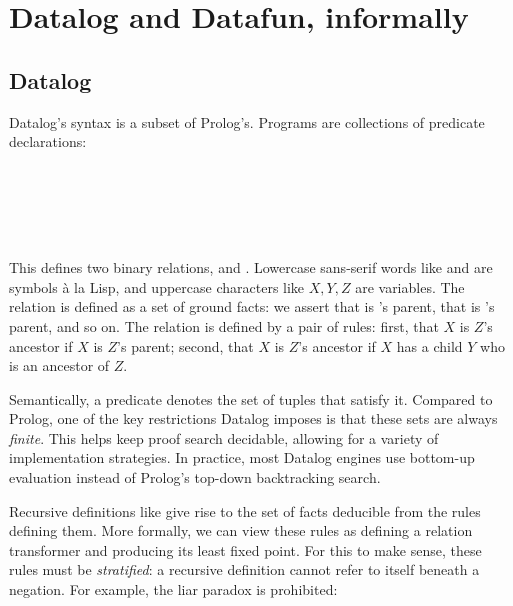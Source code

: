 \section{Datalog and Datafun, informally}
\label{sec:datalog-and-datafun}

\subsection{Datalog}
\label{sec:datalog}

Datalog's syntax is a subset of Prolog's. Programs are collections of predicate
declarations:

\begin{code}
  \\
  \\
  \\[6pt]
   \gets {}\\
   \gets {} \wedge {}
\end{code}

\noindent
This defines two binary relations,  and . Lowercase
sans-serif words like  and  are symbols \`a la
Lisp, and uppercase characters like $X,Y,Z$ are variables.
%
The  relation is defined as a set of ground facts: we assert that
 is 's parent, that  is 's
parent, and so on. The  relation is defined by a pair of rules:
first, that $X$ is $Z$'s ancestor if $X$ is $Z$'s parent; second, that $X$ is
$Z$'s ancestor if $X$ has a child $Y$ who is an ancestor of $Z$.

Semantically, a predicate denotes the set of tuples that satisfy it. Compared to
Prolog, one of the key restrictions Datalog imposes is that these sets are
always \emph{finite}. This helps keep proof search decidable, allowing for a
variety of implementation strategies. In practice, most Datalog engines use
bottom-up evaluation instead of Prolog's top-down backtracking search.

Recursive definitions like  give rise to the set of facts
deducible from the rules defining them. More formally, we can view these rules
as defining a relation transformer and producing its least fixed point. For this
to make sense, these rules must be \emph{stratified}: a recursive definition
cannot refer to itself beneath a negation. For example, the liar paradox is
prohibited:

